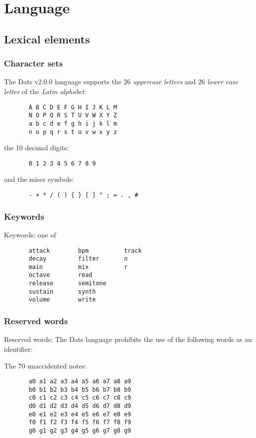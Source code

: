 \section{Language} 
\subsection{Lexical elements}
\subsubsection{Character sets}

The Dats v2.0.0 language supports the 26 \textit{uppercase letters} and 26
\textit{lower case letter} of the \textit{Latin alphabet}:

\begin{verbatim}
       A B C D E F G H I J K L M
       N O P Q R S T U V W X Y Z
       a b c d e f g h i j k l m
       n o p q r s t u v w x y z
\end{verbatim}

the 10 {decimal digits}:
\begin{verbatim}
       0 1 2 3 4 5 6 7 8 9
\end{verbatim}

and the miscs symbols:
\begin{verbatim}
       - + * / ( ) { } [ ] " ; = . , #
\end{verbatim}

\subsubsection{Keywords}

\np Keywords: one of

\begin{verbatim}
       attack        bpm          track
       decay         filter       n
       main          mix          r
       octave        read
       release       semitone
       sustain       synth
       volume        write
\end{verbatim}

\subsubsection{Reserved words}

\np Reserved words: The Dats language prohibits the use of the
following words as an identifier:

\np The 70 unaccidented notes:

\begin{verbatim}
       a0 a1 a2 a3 a4 a5 a6 a7 a8 a9
       b0 b1 b2 b3 b4 b5 b6 b7 b8 b9
       c0 c1 c2 c3 c4 c5 c6 c7 c8 c9
       d0 d1 d2 d3 d4 d5 d6 d7 d8 d9
       e0 e1 e2 e3 e4 e5 e6 e7 e8 e9
       f0 f1 f2 f3 f4 f5 f6 f7 f8 f9
       g0 g1 g2 g3 g4 g5 g6 g7 g8 g9
\end{verbatim}

